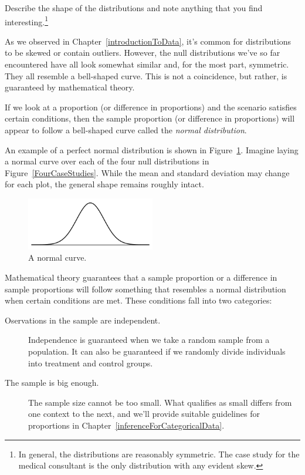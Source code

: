 \begin{exercise}
Describe the shape of the distributions and note anything that you find interesting.\footnote{In general, the distributions are reasonably symmetric. The case study for the medical consultant is the only distribution with any evident skew.}
\end{exercise}

As we observed in Chapter~\ref{introductionToData}, it's common for distributions to be skewed or contain outliers. However, the null distributions we've so far encountered have all look somewhat similar and, for the most part, symmetric. They all resemble a bell-shaped curve. This is not a coincidence, but rather, is guaranteed by  mathematical theory.

\begin{termBox}{
If we look at a proportion (or difference in proportions) and the scenario satisfies certain conditions, then the sample proportion (or difference in proportions) will appear to follow a bell-shaped curve called the \emph{normal distribution}.}
\end{termBox}

An example of a perfect normal distribution is shown in Figure~\ref{simpleNormal}. Imagine laying a normal curve over each of the four null distributions in Figure~\ref{FourCaseStudies}. While the mean and standard deviation may change for each plot, the general shape remains roughly intact.

\begin{figure}[ht]
\centering
\includegraphics[width=0.5\textwidth]{02/figures/simpleNormal/simpleNormal}
\caption{A normal curve.}
\label{simpleNormal}
\end{figure}

Mathematical theory guarantees that a sample proportion or a difference in sample proportions will follow something that resembles a normal distribution when certain conditions are met. These conditions fall into two categories:
\begin{description}
\item[Oservations in the sample are independent.] Independence is guaranteed when we take a random sample from a population. It can also be guaranteed if we randomly divide individuals into treatment and control groups.
\item[The sample is big enough.] The sample size cannot be too small. What qualifies as small differs from one context to the next, and we'll provide suitable guidelines for proportions in Chapter~\ref{inferenceForCategoricalData}.
\end{description}

